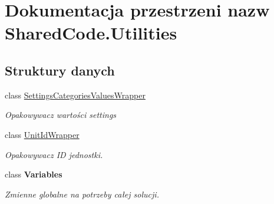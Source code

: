 \hypertarget{a00317}{}\section{Dokumentacja przestrzeni nazw Shared\+Code.\+Utilities}
\label{a00317}
\subsection*{Struktury danych}
\begin{DoxyCompactItemize}
\item 
class \hyperlink{a00055}{Settings\+Categories\+Values\+Wrapper}
\begin{DoxyCompactList}\small\item\em Opakowywacz wartości settings \end{DoxyCompactList}\item 
class \hyperlink{a00080}{Unit\+Id\+Wrapper}
\begin{DoxyCompactList}\small\item\em Opakowywacz I\+D jednostki. \end{DoxyCompactList}\item 
class {\bfseries Variables}
\begin{DoxyCompactList}\small\item\em Zmienne globalne na potrzeby całej solucji. \end{DoxyCompactList}\end{DoxyCompactItemize}
